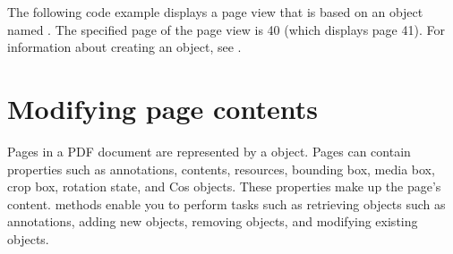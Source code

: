 \documentclass[letterpaper,12pt,english,openany,oneside]{sphinxmanual}
\begin{document}
The following code example displays a page view that is based on an  object named . The specified page of the page view is 40 (which displays page 41). For information about creating an  object, see .

\begin{sphinxVerbatim}[commandchars=\\\{\}]
  
    
     
    


          
      
    

      


      
     
    
\end{sphinxVerbatim}


\section{Modifying page contents}
\label{\detokenize{Plugins_Pages:modifying-page-contents}}
Pages in a PDF document are represented by a  object. Pages can contain properties such as annotations, contents, resources, bounding box, media box, crop box, rotation state, and Cos objects. These properties make up the page’s content.  methods enable you to perform tasks such as retrieving objects such as annotations, adding new objects, removing objects, and modifying existing objects.
\end{document}
